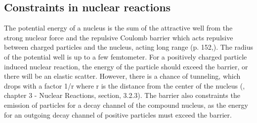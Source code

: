 \subsection{Constraints in nuclear reactions}


The potential energy of a nucleus is the sum of the attractive well from the strong nuclear force and the repulsive Coulomb barrier which acts repulsive between charged particles and the nucleus, acting long range (p. 152,\cite{Vertes2011a}). The radius of the potential well is up to a few femtometer. For a positively charged particle induced nuclear reaction, the energy of the particle should exceed the barrier, or there will be an elastic scatter. However, there is a chance of tunneling, which drops with a factor 1/r where r is the distance from the center of the nucleus (\cite{Vertes2011a}, chapter 3 - Nuclear Reactions, section, 3.2.3). The barrier also constraints the emission of particles for a decay channel of the compound nucleus, as the energy for an outgoing decay channel of positive particles must exceed the barrier. %

